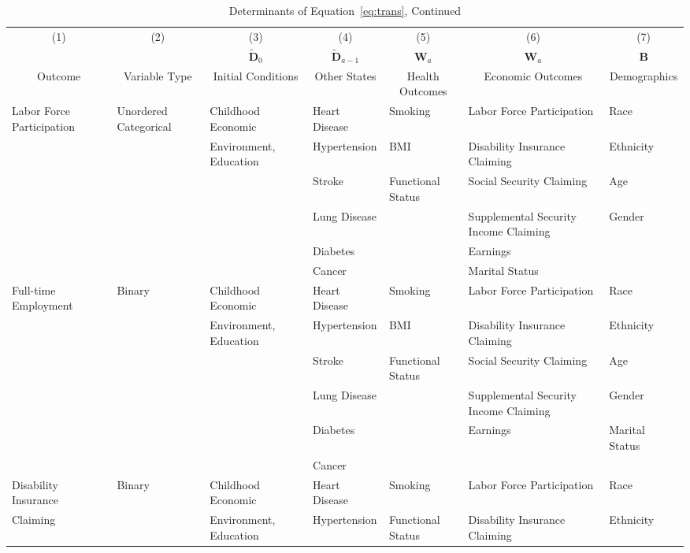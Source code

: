 \begin{table}
\caption{Determinants of Equation~\eqref{eq:trans}, Continued} \label{table:supertab3}
\begin{scriptsize}
\begin{tabular}{lllllll}
\toprule 
\multicolumn{1}{c}{(1)} & \multicolumn{1}{c}{(2)} & \multicolumn{1}{c}{(3)} & \multicolumn{1}{c}{(4)} & \multicolumn{1}{c}{(5)} & \multicolumn{1}{c}{(6)} & \multicolumn{1}{c}{(7)} \\
 & &  \multicolumn{1}{c}{$\tilde{\bm{D}}_0$} &  \multicolumn{1}{c}{$\tilde{\bm{D}}_{a-1}$} & \multicolumn{1}{c}{ $\bm{W}_a$ } &  \multicolumn{1}{c}{ $\bm{W}_a$ } &  \multicolumn{1}{c}{$\bm{B}$} \\ 
\multicolumn{1}{c}{Outcome} & \multicolumn{1}{c}{Variable Type} & \multicolumn{1}{c}{Initial Conditions} & \multicolumn{1}{c}{Other States} & \multicolumn{1}{c}{Health Outcomes} & \multicolumn{1}{c}{Economic Outcomes} & \multicolumn{1}{c}{Demographics} \\
\midrule
Labor Force Participation & Unordered Categorical & Childhood Economic& Heart Disease & Smoking & Labor Force Participation & Race \\
& & Environment, Education & Hypertension & BMI & Disability Insurance Claiming  & Ethnicity \\
& & & Stroke & Functional Status & Social Security Claiming & Age \\
& & & Lung Disease &   & Supplemental Security Income Claiming & Gender \\
& & & Diabetes &  & Earnings &  \\
& & & Cancer &  & Marital Status & \\
\midrule
Full-time Employment & Binary & Childhood Economic & Heart Disease & Smoking & Labor Force Participation & Race \\
& & Environment, Education & Hypertension & BMI & Disability Insurance Claiming  & Ethnicity \\
& & & Stroke & Functional Status & Social Security Claiming & Age \\
& & & Lung Disease &   & Supplemental Security Income Claiming & Gender \\
& & & Diabetes &  & Earnings & Marital Status \\
& & & Cancer &  &  & \\
\midrule			
Disability Insurance  & Binary & Childhood Economic & Heart Disease & Smoking & Labor Force Participation & Race \\
Claiming  & & Environment, Education & Hypertension & Functional Status & Disability Insurance Claiming  & Ethnicity \\

\end{tabular}
\end{scriptsize}
\end{table}
